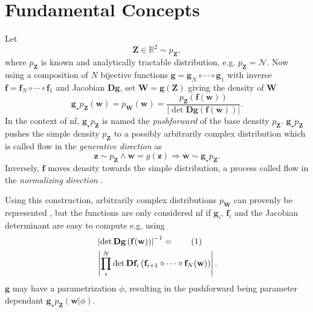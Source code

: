 \documentclass[12pt,fleqn,twocolumn]{article}
\newcommand{\ginv}{\mathbf f}
\newcommand{\push}{\mathbf g_\star p_\mathbf Z}
\newcommand{\numberthis}{\addtocounter{equation}{1}\tag{\theequation}}
\newcommand{\RR}{\ensuremath{\mathbb R}}
\newcommand{\reci}{\ensuremath{^{-1}}}
\begin{document}
\section*{Fundamental Concepts}%
Let 
\begin{equation}
    \mathbf Z \in \RR^2 \sim p_\mathbf Z,
\end{equation}
where $p_\mathbf Z$ is known and analytically tractable distribution, e.g. $p_\mathbf Z=\mathcal N$.
Now using a composition of $N$ bijective functions $\mathbf g=\mathbf g_N \circ \cdots \circ \mathbf g_1$ with inverse $\ginv=\ginv_N \circ \cdots \circ \ginv_1$ and Jacobian $\mathbf D\mathbf g$,
set $\mathbf W=\mathbf g (\mathbf Z)$ giving the density of $\mathbf W$
\begin{equation}\label{eq:dens}
    \push(\mathbf w)= p_\mathbf W(\mathbf w)=\frac{p_\mathbf Z \left(\ginv(\mathbf w)\right)}{\left| \det \mathbf D\mathbf g\left(\ginv(\mathbf w)\right) \right|}.
\end{equation}
In the context of \acrshort{nf}, $\push$ is named the \emph{pushforward} of the base density $p_\mathbf Z$.
$\push$ pushes the simple density $p_\mathbf Z$ to a possibly arbitrarily complex distribution which is called flow in the \emph{generative direction} \cite{koby2021nf} as
\begin{equation}\label{eq:gen}
    \mathbf z \sim p_\mathbf Z \wedge \mathbf w=g(\mathbf z) \Rightarrow \mathbf w \sim \push.
\end{equation}
Inversely, $\ginv$ moves density towards the simple distribution, a process called flow in the \emph{normalizing direction} \cite{koby2021nf}.

Using this construction, arbitrarily complex distributions $p_\mathbf W$ can provenly be represented \cite{boga2007triang}, but the functions are only considered \acrshort{nf} if $\mathbf g_i$, $\ginv_i$ and the Jacobian determinant are easy to compute \cite{koby2021nf} e.g. using 
\begin{align*}
    &\left| \det \mathbf D\mathbf g\left(\ginv(\mathbf w)\right) \right| \reci 
    =\numberthis\\
    &\left| \prod_i^N \det\mathbf D \ginv_i\left(\ginv_{i+1}\circ \cdots \circ \ginv_N(\mathbf w) \right)  \right|.
\end{align*}
$\mathbf g$ may have a parametrization $\phi$, resulting in the pushforward being parameter dependant $\push(\mathbf w|\phi)$.
\end{document}
